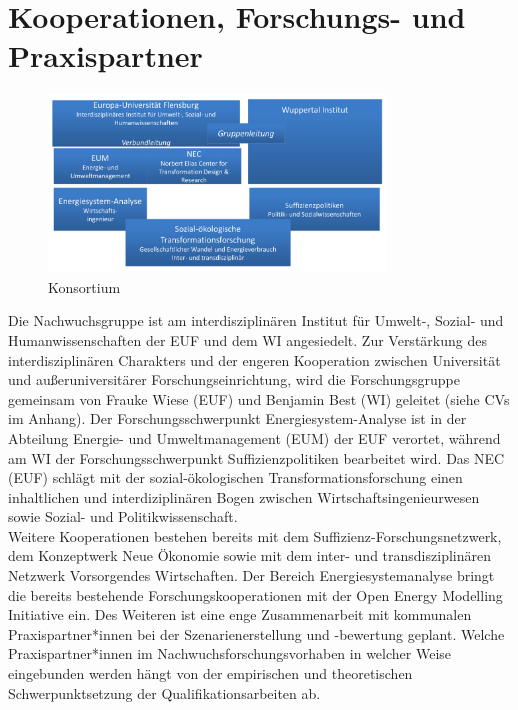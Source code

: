 \documentclass[a4paper,11pt,twoside]{scrartcl}
\begin{document}
\section{Kooperationen, Forschungs- und Praxispartner}
\label{sec:5}

\begin{figure}[!h]
    \centering
    \includegraphics[width=0.8\textwidth]{figures/Konsortium6.pdf}
    \caption{Konsortium}
    \label{fig:konsortium}
\end{figure}

Die Nachwuchsgruppe ist am interdisziplinären Institut für Umwelt-, Sozial- und Humanwissenschaften der EUF und dem WI angesiedelt.
Zur Verstärkung des interdisziplinären Charakters und der engeren Kooperation zwischen Universität und außeruniversitärer Forschungseinrichtung, wird die Forschungsgruppe gemeinsam von Frauke Wiese (EUF) und Benjamin Best (WI) geleitet (siehe CVs im Anhang). Der Forschungsschwerpunkt Energiesystem-Analyse ist in der Abteilung Energie- und Umweltmanagement (EUM) der EUF verortet, während am WI der Forschungsschwerpunkt Suffizienzpolitiken bearbeitet wird. Das NEC (EUF) schlägt mit der sozial-ökologischen Transformationsforschung einen inhaltlichen und interdiziplinären Bogen zwischen Wirtschaftsingenieurwesen sowie Sozial- und Politikwissenschaft.\\ 
Weitere Kooperationen bestehen bereits mit dem Suffizienz-Forschungsnetzwerk, dem Konzeptwerk Neue Ökonomie sowie mit dem inter- und transdisziplinären Netzwerk Vorsorgendes Wirtschaften. Der Bereich Energiesystemanalyse bringt die bereits bestehende Forschungskooperationen mit der Open Energy Modelling Initiative \cite{openmod} ein.
Des Weiteren ist eine enge Zusammenarbeit mit kommunalen Praxispartner*innen bei der Szenarienerstellung und -bewertung geplant. Welche Praxispartner*innen im Nachwuchsforschungsvorhaben in welcher Weise eingebunden werden hängt von der empirischen und theoretischen Schwerpunktsetzung der Qualifikationsarbeiten ab.
\end{document}

